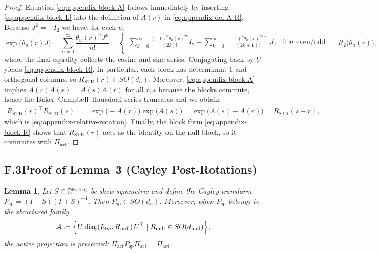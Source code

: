 \documentclass[11pt]{article}
\newcommand{\Real}{\mathbb{R}}
\newtheorem{lemma}{Lemma}
\begin{document}
\begin{proof}
Equation \eqref{eq:appendix-block-A} follows immediately by inserting \eqref{eq:appendix-block-L} into the definition
of $A(r)$ in \eqref{eq:appendix-def-A-R}.  Because $J^2 = -I_2$ we have, for each $u$,
\[
  \exp\!\big(\theta_u(r) J\big)
  = \sum_{n=0}^\infty \frac{\theta_u(r)^n J^n}{n!}
  = \begin{cases}
      \sum_{k=0}^\infty \frac{(-1)^k \theta_u(r)^{2k}}{(2k)!} I_2
        + \sum_{k=0}^\infty \frac{(-1)^k \theta_u(r)^{2k+1}}{(2k+1)!} J,
        &\text{if }n\text{ even/odd}\\[4pt]
    \end{cases}
  = R_2\big(\theta_u(r)\big),
\]
where the final equality collects the cosine and sine series.  Conjugating back by $U$ yields
\eqref{eq:appendix-block-R}.  In particular, each block has determinant $1$ and orthogonal columns, so
$R_{\mathrm{STR}}(r)\in SO(d_h)$.  Moreover, \eqref{eq:appendix-block-A} implies $A(r)A(s) = A(s)A(r)$ for
all $r,s$ because the blocks commute, hence the Baker--Campbell--Hausdorff series
truncates and we obtain
\begin{align}
  R_{\mathrm{STR}}(r)^\top R_{\mathrm{STR}}(s)
  &= \exp\!\big(-A(r)\big) \exp\!\big(A(s)\big)
   = \exp\!\big(A(s) - A(r)\big)
   = R_{\mathrm{STR}}(s-r),
\end{align}
which is \eqref{eq:appendix-relative-rotation}.  Finally, the block form \eqref{eq:appendix-block-R}
shows that $R_{\mathrm{STR}}(r)$ acts as the identity on the null block, so it commutes with
$\Pi_{\mathrm{act}}$.
\end{proof}

\subsection*{F.3\quad Proof of Lemma~3 (Cayley Post-Rotations)}

\begin{lemma}\label{lem:appendix-cayley}
Let $S\in\Real^{d_h\times d_h}$ be skew-symmetric and define the Cayley transform
$P_{\mathrm{sp}} = (I-S)(I+S)^{-1}$.  Then $P_{\mathrm{sp}}\in SO(d_h)$.  Moreover, when
$P_{\mathrm{sp}}$ belongs to the structured family
\begin{equation}
  \mathcal{A}
  \coloneqq
  \Bigl\{ U\,\mathrm{diag}(I_{2m}, R_{\mathrm{null}})\,U^\top \mid R_{\mathrm{null}}\in SO(d_{\mathrm{null}}) \Bigr\},
  \label{eq:appendix-structured-A}
\end{equation}
the active projection is preserved: $\Pi_{\mathrm{act}} P_{\mathrm{sp}} \Pi_{\mathrm{act}} = \Pi_{\mathrm{act}}$.
\end{lemma}
\end{document}
